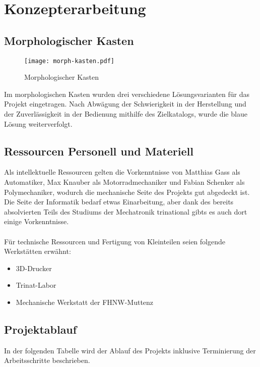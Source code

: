 \section{Konzepterarbeitung}

\subsection{Morphologischer Kasten}

\begin{figure}[H]
    \begin{center}
    \texttt{[image: morph-kasten.pdf]}
    \end{center}
    \caption{Morphologischer Kasten}
\end{figure}

Im morphologischen Kasten wurden drei verschiedene Lösungsvarianten für das Projekt eingetragen. Nach Abwägung der Schwierigkeit in der Herstellung und der Zuverlässigkeit in der Bedienung mithilfe des Zielkatalogs, wurde die blaue Lösung weiterverfolgt.

\subsection{Ressourcen Personell und Materiell}
Als intellektuelle Ressourcen gelten die Vorkenntnisse von Matthias Gass als Automatiker, Max Knauber als Motorradmechaniker und Fabian Schenker als Polymechaniker, wodurch die mechanische Seite des Projekts gut abgedeckt ist. Die Seite der Informatik bedarf etwas Einarbeitung, aber dank des bereits absolvierten Teils des Studiums der Mechatronik trinational gibts es auch dort einige Vorkenntnisse. \\
\\
Für technische Ressourcen und Fertigung von Kleinteilen seien folgende Werkstätten erwähnt:
\begin{itemize}
    \item 3D-Drucker
    \item Trinat-Labor
    \item Mechanische Werkstatt der FHNW-Muttenz
\end{itemize}

\subsection{Projektablauf}
In der folgenden Tabelle wird der Ablauf des Projekts inklusive Terminierung der Arbeitsschritte beschrieben.

